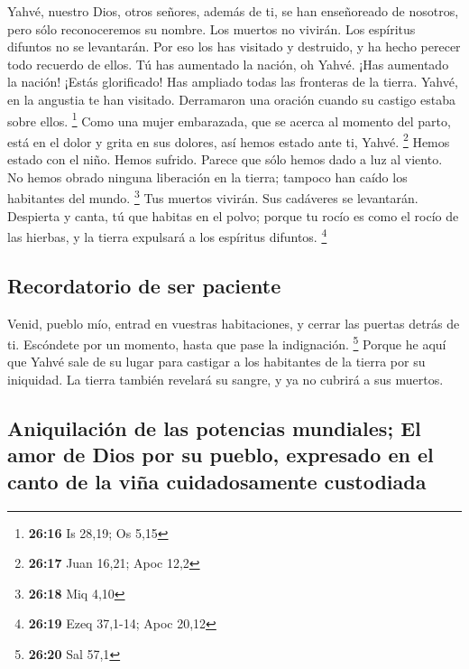  Yahvé, nuestro Dios, otros señores, además de ti, se han
enseñoreado de nosotros, pero sólo reconoceremos su nombre.
 Los muertos no vivirán. Los espíritus difuntos no se
levantarán. Por eso los has visitado y destruido, y ha hecho perecer
todo recuerdo de ellos.  Tú has aumentado la nación, oh
Yahvé. ¡Has aumentado la nación! ¡Estás glorificado! Has ampliado todas
las fronteras de la tierra.  Yahvé, en la angustia te han
visitado. Derramaron una oración cuando su castigo estaba sobre ellos.
\footnote{\textbf{26:16} Is 28,19; Os 5,15}  Como una
mujer embarazada, que se acerca al momento del parto, está en el dolor y
grita en sus dolores, así hemos estado ante ti, Yahvé. \footnote{\textbf{26:17}
  Juan 16,21; Apoc 12,2}  Hemos estado con el niño. Hemos
sufrido. Parece que sólo hemos dado a luz al viento. No hemos obrado
ninguna liberación en la tierra; tampoco han caído los habitantes del
mundo. \footnote{\textbf{26:18} Miq 4,10}  Tus muertos
vivirán. Sus cadáveres se levantarán. Despierta y canta, tú que habitas
en el polvo; porque tu rocío es como el rocío de las hierbas, y la
tierra expulsará a los espíritus difuntos. \footnote{\textbf{26:19} Ezeq
  37,1-14; Apoc 20,12}

\hypertarget{recordatorio-de-ser-paciente}{%
\subsection{Recordatorio de ser
paciente}\label{recordatorio-de-ser-paciente}}

 Venid, pueblo mío, entrad en vuestras habitaciones, y
cerrar las puertas detrás de ti. Escóndete por un momento, hasta que
pase la indignación. \footnote{\textbf{26:20} Sal 57,1} 
Porque he aquí que Yahvé sale de su lugar para castigar a los habitantes
de la tierra por su iniquidad. La tierra también revelará su sangre, y
ya no cubrirá a sus muertos.

\hypertarget{aniquilaciuxf3n-de-las-potencias-mundiales-el-amor-de-dios-por-su-pueblo-expresado-en-el-canto-de-la-viuxf1a-cuidadosamente-custodiada}{%
\subsection{Aniquilación de las potencias mundiales; El amor de Dios por
su pueblo, expresado en el canto de la viña cuidadosamente
custodiada}\label{aniquilaciuxf3n-de-las-potencias-mundiales-el-amor-de-dios-por-su-pueblo-expresado-en-el-canto-de-la-viuxf1a-cuidadosamente-custodiada}}

